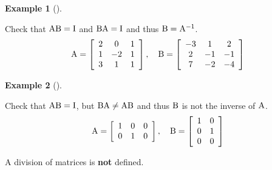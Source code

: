 \documentclass[
  a4paper,
  DIV=11,
  numbers=noendperiod,
  oneside]{scrreprt}
\theoremstyle{definition}
\newtheorem{example}{Example}[chapter]
\theoremstyle{remark}
\begin{document}
\begin{example}[]\protect\hypertarget{exm-}{}\label{exm-}

Check that \({\rm A}{\rm B}= {\rm I}\) and \({\rm B}{\rm A} = {\rm I}\)
and thus \({\rm B} = {\rm A}^{-1}\). \[{\rm A}=\left[ \begin{array}{ccc}
 2 & 0 & 1 \\
 1 & {-2} & 1 \\
 3 & 1 & 1 
\end{array}  \right], \quad 
{\rm B}=\left[ \begin{array}{ccc}
 {-3} & 1 & 2 \\
 2 & {-1} & {-1} \\
 7 & {-2} & {-4}
\end{array}  \right]\]

\end{example}

\begin{example}[]\protect\hypertarget{exm-}{}\label{exm-}

Check that \({\rm A}{\rm B}= {\rm I}\), but
\({\rm B}{\rm A} \neq {\rm A}{\rm B}\) and thus \({\rm B}\) is not the
inverse of \({\rm A}\). \[{\rm A}=\left[ \begin{array}{ccc}
 1 & 0 & 0 \\
 0 & 1 & 0 
\end{array}  \right], \quad 
{\rm B}=\left[ \begin{array}{ccc}
 1 & 0  \\
 0 & 1  \\
 0 & 0
\end{array}  \right]\]

\end{example}

\begin{tcolorbox}[enhanced jigsaw, opacitybacktitle=0.6, left=2mm, breakable, bottomrule=.15mm, colbacktitle=quarto-callout-warning-color!10!white, leftrule=.75mm, titlerule=0mm, rightrule=.15mm, toprule=.15mm, colback=white, toptitle=1mm, colframe=quarto-callout-warning-color-frame, coltitle=black, bottomtitle=1mm, title=\textcolor{quarto-callout-warning-color}{\faExclamationTriangle}\hspace{0.5em}{Warning}, opacityback=0, arc=.35mm]

A division of matrices is \textbf{not} defined.

\end{tcolorbox}
\end{document}
